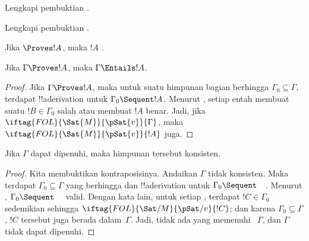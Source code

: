 \documentclass[../../../include/open-logic-section]{subfiles}
\begin{document}
\begin{prob}
Lengkapi pembuktian .
\end{prob}
\tagendprob

\begin{prob}
Lengkapi pembuktian .
\end{prob}
\tagendprob

\begin{cor}
Jika $\Proves !A$, maka $!A$ .
\end{cor}

\begin{cor}
Jika $\Gamma \Proves !A$, maka $\Gamma \Entails !A$.
\end{cor}

\begin{proof}
Jika $\Gamma \Proves !A$, maka untuk suatu himpunan bagian berhingga
$\Gamma_0 \subseteq \Gamma$, terdapat !!a{derivation} untuk
$\Gamma_0 \Sequent !A$. Menurut , setiap
entah membuat suatu $!B \in \Gamma_0$ salah atau membuat $!A$ benar.
Jadi, jika $\iftag{FOL}{\Sat{M}}{\pSat{v}}{\Gamma}$, maka
$\iftag{FOL}{\Sat{M}}{\pSat{v}}{!A}$ juga.
\end{proof}

\begin{cor}
Jika $\Gamma$ dapat dipenuhi, maka himpunan tersebut konsisten.
\end{cor}

\begin{proof}
Kita membuktikan kontraposisinya. Andaikan $\Gamma$ tidak konsisten.
Maka terdapat $\Gamma_0 \subseteq \Gamma$ yang berhingga dan
!!a{derivation} untuk $\Gamma_0 \Sequent \quad$. Menurut
, $\Gamma_0 \Sequent \quad$ valid. Dengan
kata lain, untuk setiap
,
terdapat $!C \in \Gamma_0$ sedemikian sehingga
$\iftag{FOL}{\Sat/{M}}{\pSat/{v}}{!C}$; dan karena
$\Gamma_0 \subseteq \Gamma$, $!C$ tersebut juga berada dalam~$\Gamma$.
Jadi, tidak ada  yang memenuhi
~$\Gamma$, dan $\Gamma$ tidak dapat dipenuhi.
\end{proof}
\end{document}
